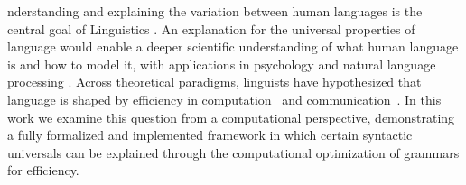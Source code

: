 \documentclass[9pt,twocolumn,twoside,lineno]{pnas-new}
\begin{document}


nderstanding and explaining the variation between human languages is the central  goal of Linguistics \cite{zipf1949human,greenberg1963universals,chomsky1993lectures,...}.
An explanation for the universal properties of language would enable a deeper scientific understanding of what human language is and how to model it, with applications in psychology and natural language processing \cite{hawkins2007processing,bender2009linguistically,bender2013linguistic}.
Across theoretical paradigms, linguists have hypothesized that language is shaped by efficiency in computation~\cite{chomsky2005three, berwick1984grammatical,hawkins2007processing} and communication~\cite{zipf1949human, Croft:Cruse:2004, Goldberg:2005}.
In this work we examine this question from a computational perspective, demonstrating a fully formalized and implemented framework in which certain syntactic universals can be explained through the computational optimization of grammars for efficiency. %








\end{document}
